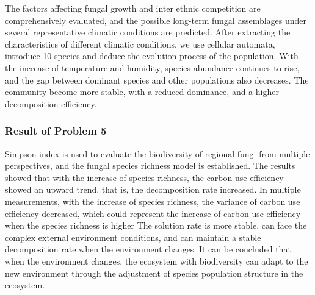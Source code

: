 \documentclass{mcmthesis}
\begin{document}




The factors affecting fungal growth and inter ethnic competition are comprehensively evaluated, and the possible long-term fungal assemblages under several representative climatic conditions are predicted. After extracting the characteristics of different climatic conditions, we use cellular automata, introduce 10 species and deduce the evolution process of the population. With the increase of temperature and humidity, species abundance continues to rise, and the gap between dominant species and other populations also decreases. The community become more stable, with a reduced dominance, and a higher decomposition efficiency.

\subsubsection*{Result of Problem 5}

Simpson index is used to evaluate the biodiversity of regional fungi from multiple perspectives, and the fungal species richness model is established. The results showed that with the increase of species richness, the carbon use efficiency showed an upward trend, that is, the decomposition rate increased. In multiple measurements, with the increase of species richness, the variance of carbon use efficiency decreased, which could represent the increase of carbon use efficiency when the species richness is higher The solution rate is more stable, can face the complex external environment conditions, and can maintain a stable decomposition rate when the environment changes. It can be concluded that when the environment changes, the ecosystem with biodiversity can adapt to the new environment through the adjustment of species population structure in the ecosystem.
\end{document}
